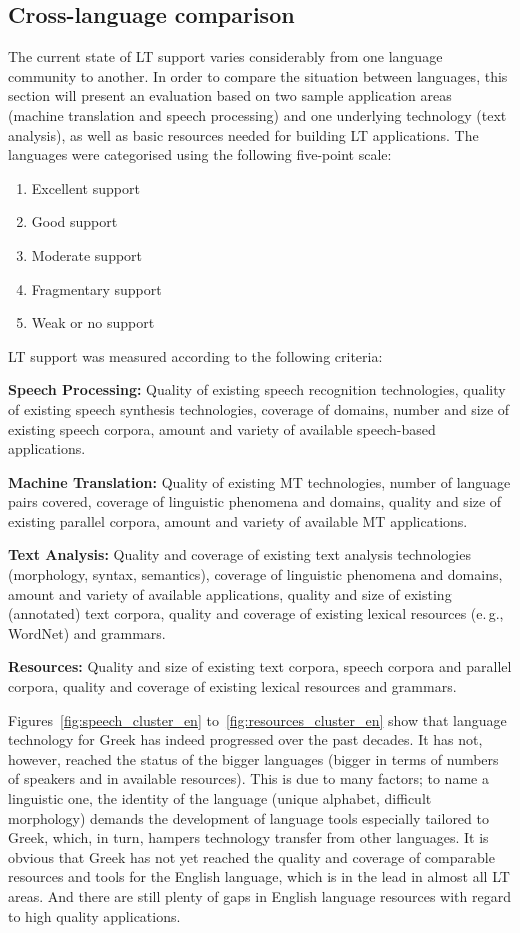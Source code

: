 \documentclass[]{../../metanetpaper}
\begin{document}
\begin{multicols}{2}
\subsection{Cross-language comparison}

The current state of LT support varies considerably from one language community to another. In order to compare the situation between languages, this section will present an evaluation based on two sample application areas (machine translation and speech processing) and one underlying technology (text analysis), as well as basic resources needed for building LT applications. The languages were categorised using the following five-point scale: 

\begin{enumerate}
\item Excellent support
\item Good support
\item Moderate support
\item Fragmentary support
\item Weak or no support
\end{enumerate}

LT support was measured according to the following criteria:

\textbf{Speech Processing:} Quality of existing speech recognition technologies, quality of existing speech synthesis technologies, coverage of domains, number and size of existing speech corpora, amount and variety of available speech-based applications.

\textbf{Machine Translation:} Quality of existing MT technologies, number of language pairs covered, coverage of linguistic phenomena and domains, quality and size of existing parallel corpora, amount and variety of available MT applications.

\textbf{Text Analysis:} Quality and coverage of existing text analysis technologies (morphology, syntax, semantics), coverage of linguistic phenomena and domains, amount and variety of available applications, quality and size of existing (annotated) text corpora, quality and coverage of existing lexical resources (e.\,g., WordNet) and grammars.

\textbf{Resources:} Quality and size of existing text corpora, speech corpora and parallel corpora, quality and coverage of existing lexical resources and grammars.

Figures~\ref{fig:speech_cluster_en} to~\ref{fig:resources_cluster_en} show that language technology for Greek has indeed progressed over the past decades. It has not, however, reached the status of the bigger languages (bigger in terms of numbers of speakers and in available resources). This is due to many factors; to name a linguistic one, the identity of the language (unique alphabet, difficult morphology) demands the development of language tools especially tailored to Greek, which, in turn, hampers technology transfer from other languages. It is obvious that Greek has not yet reached the quality and coverage of comparable resources and tools for the English language, which is in the lead in almost all LT areas. And there are still plenty of gaps in English language resources with regard to high quality applications.


\end{multicols}
\end{document}
